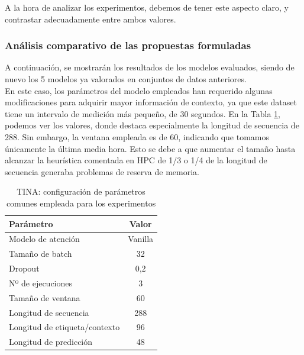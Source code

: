 A la hora de analizar los experimentos, debemos de tener este aspecto claro, y contrastar adecuadamente entre ambos valores.

\subsubsection{Análisis comparativo de las propuestas formuladas}

A continuación, se mostrarán los resultados de los modelos evaluados, siendo de nuevo los 5 modelos ya valorados en conjuntos de datos anteriores.\\

En este caso, los parámetros del modelo empleados han requerido algunas modificaciones para adquirir mayor información de contexto, ya que este dataset tiene un intervalo de medición más pequeño, de 30 segundos. En la Tabla \ref{ajustestina}, podemos ver los valores, donde destaca especialmente la longitud de secuencia de 288. Sin embargo, la ventana empleada es de 60, indicando que tomamos únicamente la última media hora. Esto se debe a que aumentar el tamaño hasta alcanzar la heurística comentada en HPC de 1/3 o 1/4 de la longitud de secuencia generaba problemas de reserva de memoria.

\begin{table}[!ht]
	\centering
	\begin{tabular}{l|c}
		\toprule
		Parámetro & Valor \\
		\midrule
		{Modelo de atención} & Vanilla \\
		{Tamaño de batch} & 32 \\
		{Dropout} & 0,2 \\
		{Nº de ejecuciones} & 3 \\
		{Tamaño de ventana} & 60 \\
		{Longitud de secuencia} & 288 \\
		{Longitud de etiqueta/contexto} & 96 \\
		{Longitud de predicción} & 48 \\
		\bottomrule
	\end{tabular}
	\caption{TINA: configuración de parámetros comunes empleada para los experimentos}
	\label{ajustestina}
\end{table}


